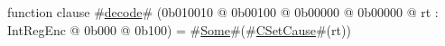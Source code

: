 function clause #\hyperref[zdecode]{decode}# (0b010010 @ 0b00100 @ 0b00000 @ 0b00000 @ rt : IntRegEnc @ 0b000 @ 0b100) = #\hyperref[zSome]{Some}#(#\hyperref[zCSetCause]{CSetCause}#(rt))
